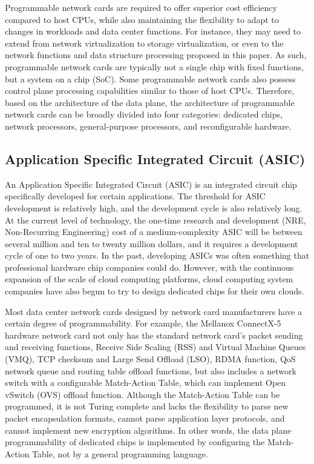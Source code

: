 Programmable network cards are required to offer superior cost efficiency compared to host CPUs, while also maintaining the flexibility to adapt to changes in workloads and data center functions. For instance, they may need to extend from network virtualization to storage virtualization, or even to the network functions and data structure processing proposed in this paper. As such, programmable network cards are typically not a single chip with fixed functions, but a system on a chip (SoC). Some programmable network cards also possess control plane processing capabilities similar to those of host CPUs. Therefore, based on the architecture of the data plane, the architecture of programmable network cards can be broadly divided into four categories: dedicated chips, network processors, general-purpose processors, and reconfigurable hardware.

\subsection{Application Specific Integrated Circuit (ASIC)}
\label{smartnic-asic}

An Application Specific Integrated Circuit (ASIC) is an integrated circuit chip specifically developed for certain applications. The threshold for ASIC development is relatively high, and the development cycle is also relatively long. At the current level of technology, the one-time research and development (NRE, Non-Recurring Engineering) cost of a medium-complexity ASIC will be between several million and ten to twenty million dollars, and it requires a development cycle of one to two years. In the past, developing ASICs was often something that professional hardware chip companies could do. However, with the continuous expansion of the scale of cloud computing platforms, cloud computing system companies have also begun to try to design dedicated chips for their own clouds.

Most data center network cards designed by network card manufacturers have a certain degree of programmability. For example, the Mellanox ConnectX-5 \cite{mellanox-connectx-5} hardware network card not only has the standard network card's packet sending and receiving functions, Receive Side Scaling (RSS) and Virtual Machine Queues (VMQ), TCP checksum and Large Send Offload (LSO), RDMA function, QoS network queue and routing table offload functions, but also includes a network switch with a configurable Match-Action Table, which can implement Open vSwitch (OVS) offload function. Although the Match-Action Table can be programmed, it is not Turing complete and lacks the flexibility to parse new packet encapsulation formats, cannot parse application layer protocols, and cannot implement new encryption algorithms. In other words, the data plane programmability of dedicated chips is implemented by configuring the Match-Action Table, not by a general programming language.


